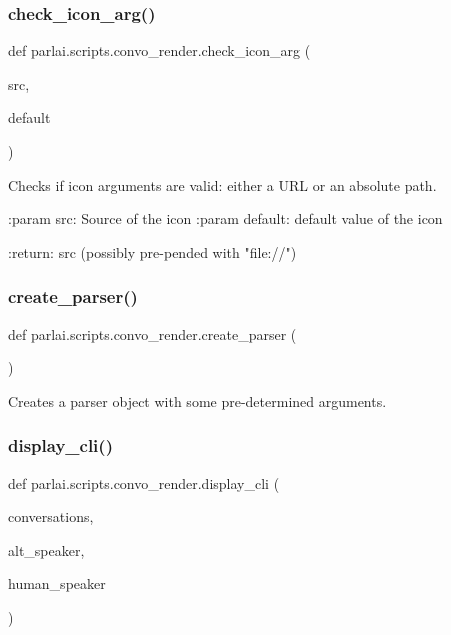 \subsubsection{\texorpdfstring{check\+\_\+icon\+\_\+arg()}{check\_icon\_arg()}}
{\footnotesize\ttfamily def parlai.\+scripts.\+convo\+\_\+render.\+check\+\_\+icon\+\_\+arg (\begin{DoxyParamCaption}\item[{}]{src,  }\item[{}]{default }\end{DoxyParamCaption})}

\begin{DoxyVerb}Checks if icon arguments are valid: either a URL or an absolute path.

:param src: Source of the icon
:param default: default value of the icon

:return: src (possibly pre-pended with "file://")
\end{DoxyVerb}
 \mbox{\label{namespaceparlai_1_1scripts_1_1convo__render_a4220e40f3e0c5ac320177b6e0f3d8e83}} 
\subsubsection{\texorpdfstring{create\+\_\+parser()}{create\_parser()}}
{\footnotesize\ttfamily def parlai.\+scripts.\+convo\+\_\+render.\+create\+\_\+parser (\begin{DoxyParamCaption}{ }\end{DoxyParamCaption})}

\begin{DoxyVerb}Creates a parser object with some pre-determined arguments.
\end{DoxyVerb}
 \mbox{\label{namespaceparlai_1_1scripts_1_1convo__render_a68e7e186a59ac2397560d0107f804ff3}} 
\subsubsection{\texorpdfstring{display\+\_\+cli()}{display\_cli()}}
{\footnotesize\ttfamily def parlai.\+scripts.\+convo\+\_\+render.\+display\+\_\+cli (\begin{DoxyParamCaption}\item[{}]{conversations,  }\item[{}]{alt\+\_\+speaker,  }\item[{}]{human\+\_\+speaker }\end{DoxyParamCaption})}

